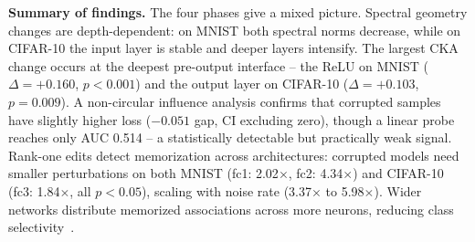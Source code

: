 \documentclass{article}
\begin{document}
\textbf{Summary of findings.} The four phases give a mixed picture. Spectral geometry changes are depth-dependent: on MNIST both spectral norms decrease, while on CIFAR-10 the input layer is stable and deeper layers intensify. The largest CKA change occurs at the deepest pre-output interface -- the ReLU on MNIST ($\Delta=+0.160$, $p<0.001$) and the output layer on CIFAR-10 ($\Delta=+0.103$, $p=0.009$). A non-circular influence analysis confirms that corrupted samples have slightly higher loss ($-0.051$ gap, CI excluding zero), though a linear probe reaches only AUC 0.514 -- a statistically detectable but practically weak signal. Rank-one edits detect memorization across architectures: corrupted models need smaller perturbations on both MNIST (fc1: 2.02$\times$, fc2: 4.34$\times$) and CIFAR-10 (fc3: 1.84$\times$, all $p<0.05$), scaling with noise rate (3.37$\times$ to 5.98$\times$). Wider networks distribute memorized associations across more neurons, reducing class selectivity~\cite{elhage2022toy}.
\end{document}
